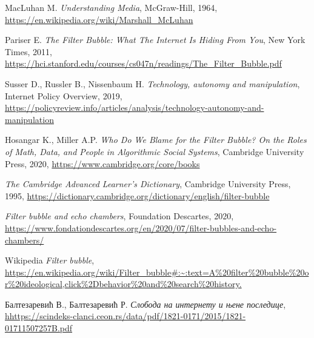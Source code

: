 \documentclass[a4paper]{article}
\begin{document}
\begin{thebibliography}{7}

 MacLuhan M. \emph{Understanding Media}, McGraw-Hill, 1964, \url{https://en.wikipedia.org/wiki/Marshall_McLuhan}

 Pariser E. \emph{The Filter Bubble: What The Internet Is Hiding From You}, New York Times, 2011, \url{https://hci.stanford.edu/courses/cs047n/readings/The_Filter_Bubble.pdf}

 Susser D., Russler B., Nissenbaum H. \emph{Technology, autonomy and manipulation}, Internet Policy Overview, 2019, \url{https://policyreview.info/articles/analysis/technology-autonomy-and-manipulation}

 Hosangar K., Miller A.P. \emph{Who Do We Blame for the Filter Bubble? On the Roles of Math, Data, and People in Algorithmic Social Systems}, Cambridge University Press, 2020, \url{https://www.cambridge.org/core/books}

 \emph{The Cambridge Advanced Learner's Dictionary}, Cambridge University Press, 1995, \url{https://dictionary.cambridge.org/dictionary/english/filter-bubble}

 \emph{Filter bubble and echo chambers}, Foundation Descartes, 2020, \url{https://www.fondationdescartes.org/en/2020/07/filter-bubbles-and-echo-chambers/}

 Wikipedia \emph{Filter bubble}, \url{https://en.wikipedia.org/wiki/Filter_bubble#:~:text=A%20filter%20bubble%20or%20ideological,click%2Dbehavior%20and%20search%20history.}

 Балтезаревић В., Балтезаревић Р. \emph{Слобода на интернету и њене последице}, \url{hhttps://scindeks-clanci.ceon.rs/data/pdf/1821-0171/2015/1821-01711507257B.pdf}


\end{thebibliography}
\end{document}
